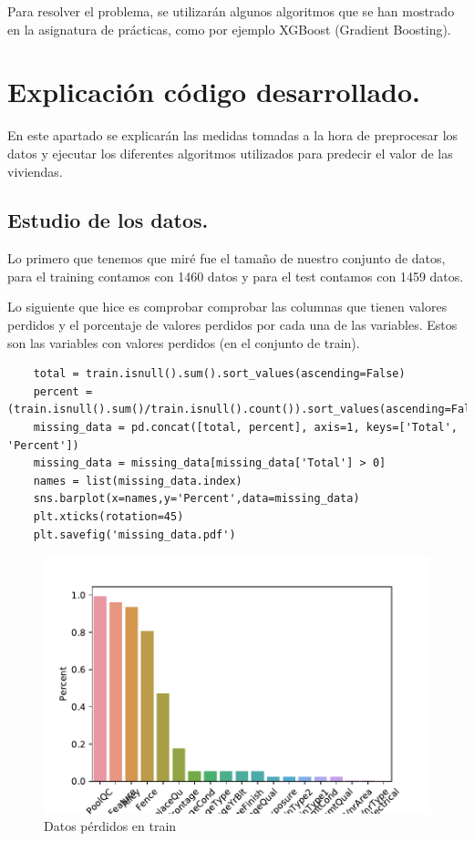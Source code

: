 	\vspace{0.06in}
	Para resolver el problema, se utilizarán algunos algoritmos que se han mostrado en la asignatura de prácticas, como por ejemplo XGBoost (Gradient Boosting).
	
	\section[Explicación]{Explicación código desarrollado.}
	En este apartado se explicarán las medidas tomadas a la hora de preprocesar los datos y ejecutar los diferentes algoritmos utilizados para predecir el valor de las viviendas.
	
	\vspace{0.06in}
	
	\subsection{Estudio de los datos.}
	Lo primero que tenemos que miré fue el tamaño de nuestro conjunto de datos, para el training contamos con 1460 datos y para el test contamos con 1459 datos.
	
	\vspace{0.06in}
	Lo siguiente que hice es comprobar comprobar las columnas que tienen valores perdidos y el porcentaje de valores perdidos por cada una de las variables. Estos son las variables con valores perdidos (en el conjunto de train).
	
	\begin{lstlisting}
	total = train.isnull().sum().sort_values(ascending=False)
	percent = (train.isnull().sum()/train.isnull().count()).sort_values(ascending=False)
	missing_data = pd.concat([total, percent], axis=1, keys=['Total', 'Percent'])
	missing_data = missing_data[missing_data['Total'] > 0]
	names = list(missing_data.index)
	sns.barplot(x=names,y='Percent',data=missing_data)
	plt.xticks(rotation=45)
	plt.savefig('missing_data.pdf')
	\end{lstlisting}
	
	\begin{figure}[H]
		\centering
		\includegraphics[scale=0.8]{imag/missing_data.pdf}
		\caption{Datos pérdidos en train}
		\label{fig:missing_data_train}
	\end{figure}
	
